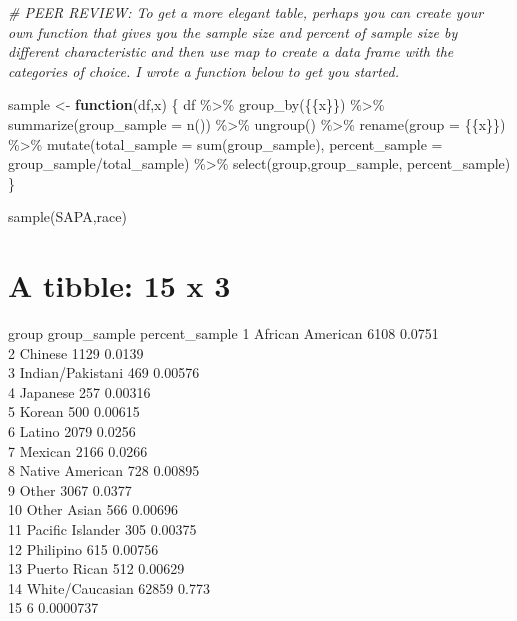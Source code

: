 \documentclass[
]{article}
\newenvironment{Shaded}{\begin{snugshade}}{\end{snugshade}}
\newcommand{\AttributeTok}[1]{\textcolor[rgb]{0.77,0.63,0.00}{#1}}
\newcommand{\CommentTok}[1]{\textcolor[rgb]{0.56,0.35,0.01}{\textit{#1}}}
\newcommand{\ControlFlowTok}[1]{\textcolor[rgb]{0.13,0.29,0.53}{\textbf{#1}}}
\newcommand{\FunctionTok}[1]{\textcolor[rgb]{0.00,0.00,0.00}{#1}}
\newcommand{\NormalTok}[1]{#1}
\newcommand{\OtherTok}[1]{\textcolor[rgb]{0.56,0.35,0.01}{#1}}
\newcommand{\SpecialCharTok}[1]{\textcolor[rgb]{0.00,0.00,0.00}{#1}}
\begin{document}
\begin{Shaded}
\begin{Highlighting}[]
\CommentTok{\# PEER REVIEW: To get a more elegant table, perhaps you can create your own function that gives you the sample size and percent of sample size by different characteristic and then use map to create a data frame with the categories of choice. I wrote a function below to get you started.}

\NormalTok{sample }\OtherTok{\textless{}{-}} \ControlFlowTok{function}\NormalTok{(df,x) \{}
\NormalTok{  df }\SpecialCharTok{\%\textgreater{}\%}
  \FunctionTok{group\_by}\NormalTok{(\{\{x\}\}) }\SpecialCharTok{\%\textgreater{}\%}
  \FunctionTok{summarize}\NormalTok{(}\AttributeTok{group\_sample =} \FunctionTok{n}\NormalTok{()) }\SpecialCharTok{\%\textgreater{}\%}
  \FunctionTok{ungroup}\NormalTok{() }\SpecialCharTok{\%\textgreater{}\%}
  \FunctionTok{rename}\NormalTok{(}\AttributeTok{group =}\NormalTok{ \{\{x\}\}) }\SpecialCharTok{\%\textgreater{}\%}
  \FunctionTok{mutate}\NormalTok{(}\AttributeTok{total\_sample =} \FunctionTok{sum}\NormalTok{(group\_sample),}
         \AttributeTok{percent\_sample =}\NormalTok{ group\_sample}\SpecialCharTok{/}\NormalTok{total\_sample) }\SpecialCharTok{\%\textgreater{}\%}
  \FunctionTok{select}\NormalTok{(group,group\_sample, percent\_sample)}
\NormalTok{\}}

\FunctionTok{sample}\NormalTok{(SAPA,race)}
\end{Highlighting}
\end{Shaded}

\hypertarget{a-tibble-15-x-3}{%
\section{A tibble: 15 x 3}\label{a-tibble-15-x-3}}

group group\_sample percent\_sample
1 African American 6108 0.0751\\
2 Chinese 1129 0.0139\\
3 Indian/Pakistani 469 0.00576\\
4 Japanese 257 0.00316\\
5 Korean 500 0.00615\\
6 Latino 2079 0.0256\\
7 Mexican 2166 0.0266\\
8 Native American 728 0.00895\\
9 Other 3067 0.0377\\
10 Other Asian 566 0.00696\\
11 Pacific Islander 305 0.00375\\
12 Philipino 615 0.00756\\
13 Puerto Rican 512 0.00629\\
14 White/Caucasian 62859 0.773\\
15 6 0.0000737
\end{document}
